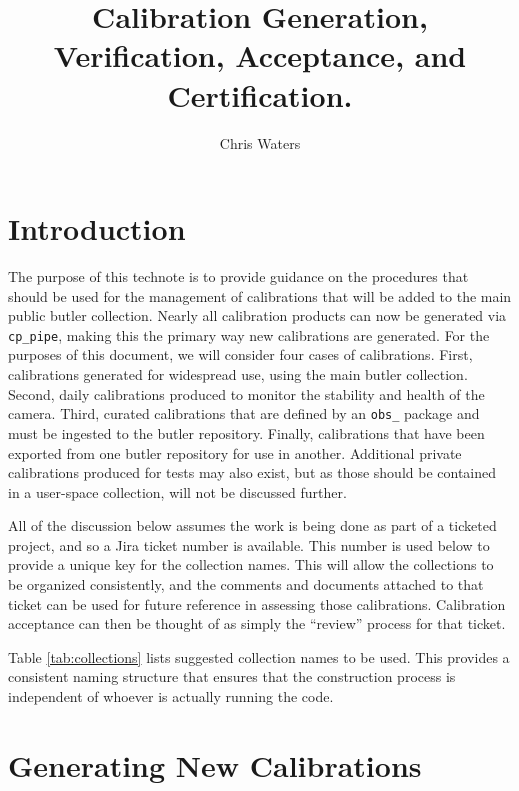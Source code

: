 \documentclass[DM,authoryear,toc]{lsstdoc}
\title{Calibration Generation, Verification, Acceptance, and Certification.}
\author{%
Chris Waters
}
\date{\vcsDate}
\begin{document}
\maketitle


\section{Introduction}

The purpose of this technote is to provide guidance on the procedures that should be used for the management of calibrations that will be added to the main public butler collection.  Nearly all calibration products can now be generated via \verb|cp_pipe|, making this the primary way new calibrations are generated.  For the purposes of this document, we will consider four cases of calibrations.  First, calibrations generated for widespread use, using the main butler collection.  Second, daily calibrations produced to monitor the stability and health of the camera.  Third, curated calibrations that are defined by an \verb|obs_| package and must be ingested to the butler repository.  Finally, calibrations that have been exported from one butler repository for use in another.  Additional private calibrations produced for tests may also exist, but as those should be contained in a user-space collection, will not be discussed further.

All of the discussion below assumes the work is being done as part of a ticketed project, and so a Jira ticket number is available.  This number is used below to provide a unique key for the collection names.  This will allow the collections to be organized consistently, and the comments and documents attached to that ticket can be used for future reference in assessing those calibrations.  Calibration acceptance can then be thought of as simply the ``review'' process for that ticket.

Table \ref{tab:collections} lists suggested collection names to be used.  This provides a consistent naming structure that ensures that the construction process is independent of whoever is actually running the code.

\section{Generating New Calibrations}
\end{document}
